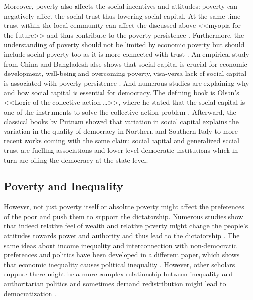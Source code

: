 \documentclass[a4paper, 12pt]{article}
\begin{document}
	Moreover, poverty also affects the social incentives and attitudes: poverty can negatively affect the social trust \parencite{trust_poverty2} thus lowering social capital. At the same time trust within the local community can affect the discussed above <<myopia for the future>> and thus contribute to the poverty persistence \parencite{trust_poverty}. Furthermore, the understanding of poverty should not be limited by economic poverty but should include social poverty too as it is more connected with trust \parencite{trust_poverty3}. An empirical study from China and Bangladesh also shows that social capital is crucial for economic development, well-being and overcoming poverty, visa-versa lack of social capital is associated with poverty persistence \parencite{poverty_capital, poverty_capital2, poverty_capital3}. And numerous studies are explaining why and how social capital is essential for democracy. The defining book is Olson's <<Logic of the collective action \dots>>, where he stated that the social capital is one of the instruments to solve the collective action problem \parencite{collective_action}. Afterward, the classical books by Putnam showed that variation in social capital explains the variation in the quality of democracy in Northern and Southern Italy \parencite{italy_capital, bowling} to more recent works \parencite{social_capital_democracy} coming with the same claim: social capital and generalized social trust are fuelling associations and lower-level democratic institutions which in turn are oiling the democracy at the state level.
    
    \subsection{Poverty and Inequality}
    
    \noindent However, not just poverty itself or absolute poverty might affect the preferences of the poor and push them to support the dictatorship. Numerous studies show that indeed relative feel of wealth and relative poverty might change the people's attitudes towards power and authority and thus lead to the dictatorship \parencite{relative_power}. The same ideas about income inequality and interconnection with non-democratic preferences and politics have been developed in a different paper, which shows that economic inequality causes political inequality \parencite{inequality_regimes}. However, other scholars suppose there might be a more complex relationship between inequality and authoritarian politics \parencite{regime_inequality} and sometimes demand redistribution might lead to democratization \parencite{inequality_democracy}.
	
\end{document}
